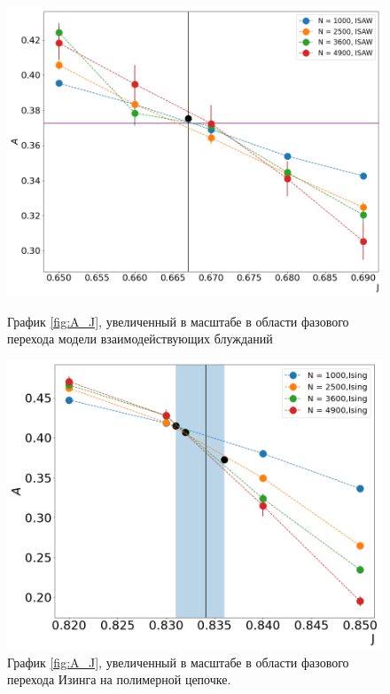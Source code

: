 \begin{figure}[h!]
\begin{minipage}{0.45\textwidth}
    \includegraphics[width=\textwidth]{Sections/Images/ISAW_A_J_Close.png}
    \caption{График \ref{fig:A_J}, увеличенный в масштабе в области фазового перехода модели взаимодействующих блужданий}
    \label{fig:ISAW_A_J_Zoom}
\end{minipage}
\hfill
\begin{minipage}{0.45\textwidth}
    \includegraphics[width=\textwidth]{Sections/Images/Ising_A_J_Close.png}
    \caption{График \ref{fig:A_J}, увеличенный в масштабе в области фазового перехода Изинга на полимерной цепочке. }
    \label{fig:Is_A_J_Zoom}
\end{minipage}

\end{figure}

